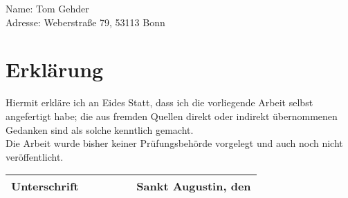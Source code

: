 Name: Tom Gehder \\
Adresse: Weberstraße 79, 53113 Bonn\\

\section*{Erklärung}
Hiermit erkläre ich an Eides Statt, dass ich die vorliegende Arbeit selbst angefertigt
habe; die aus fremden Quellen direkt oder indirekt übernommenen Gedanken sind
als solche kenntlich gemacht.\\

Die Arbeit wurde bisher keiner Prüfungsbehörde vorgelegt und auch noch nicht
veröffentlicht.


\begin{table}[b]
    \begin{tabular}{p{0.5\linewidth} p{0.5\linewidth}}
        Unterschrift & Sankt Augustin, den \\
        \hline
    \end{tabular}
\end{table}